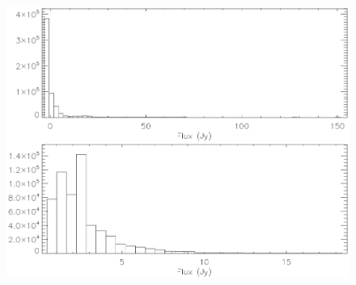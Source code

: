 \begin{figure}[h]
  \includegraphics[clip,angle=0,width=\columnwidth]{Figures/histo_galaxy_dipole.eps}
  \caption{}
  \label{fig:histo_galaxy_dipole}
\end{figure}

%


